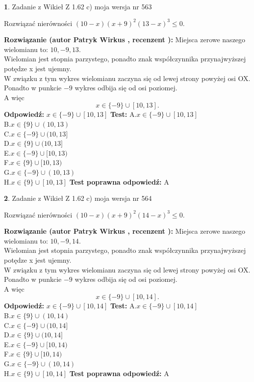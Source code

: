 \documentclass[12pt, a4paper]{article}
\theoremstyle{definition} %
\newtheorem{zad}{}
\newcommand{\zadStart}[1]{\begin{zad}#1\newline}
\newcommand{\zadStop}{\end{zad}}
\newcommand{\rozwStart}[2]{\noindent \textbf{Rozwiązanie (autor #1 , recenzent #2): }\newline}
\newcommand{\rozwStop}{\newline}
\newcommand{\odpStart}{\noindent \textbf{Odpowiedź:}\newline}
\newcommand{\odpStop}{\newline}
\newcommand{\testStart}{\noindent \textbf{Test:}\newline}
\newcommand{\testStop}{\newline}
\newcommand{\kluczStart}{\noindent \textbf{Test poprawna odpowiedź:}\newline}
\newcommand{\kluczStop}{\newline}
\begin{document}
\zadStart{Zadanie z Wikieł Z 1.62 c) moja wersja nr 563}

Rozwiązać nierówności $(10-x)(x+9)^{2}(13-x)^{3}\le0$.
\zadStop
\rozwStart{Patryk Wirkus}{}
Miejsca zerowe naszego wielomianu to: $10, -9, 13$.\\
Wielomian jest stopnia parzystego, ponadto znak współczynnika przy\linebreak najwyższej potędze x jest ujemny.\\ W związku z tym wykres wielomianu zaczyna się od lewej strony powyżej osi OX.\\
Ponadto w punkcie $-9$ wykres odbija się od osi poziomej.\\
A więc $$x \in \{-9\} \cup [10,13].$$
\rozwStop
\odpStart
$x \in \{-9\} \cup [10,13]$
\odpStop
\testStart
A.$x \in \{-9\} \cup [10,13]$\\
B.$x \in \{9\} \cup (10,13)$\\
C.$x \in \{-9\} \cup (10,13]$\\
D.$x \in \{9\} \cup (10,13]$\\
E.$x \in \{-9\} \cup [10,13)$\\
F.$x \in \{9\} \cup [10,13)$\\
G.$x \in \{-9\} \cup (10,13)$\\
H.$x \in \{9\} \cup [10,13]$
\testStop
\kluczStart
A
\kluczStop



\zadStart{Zadanie z Wikieł Z 1.62 c) moja wersja nr 564}

Rozwiązać nierówności $(10-x)(x+9)^{2}(14-x)^{3}\le0$.
\zadStop
\rozwStart{Patryk Wirkus}{}
Miejsca zerowe naszego wielomianu to: $10, -9, 14$.\\
Wielomian jest stopnia parzystego, ponadto znak współczynnika przy\linebreak najwyższej potędze x jest ujemny.\\ W związku z tym wykres wielomianu zaczyna się od lewej strony powyżej osi OX.\\
Ponadto w punkcie $-9$ wykres odbija się od osi poziomej.\\
A więc $$x \in \{-9\} \cup [10,14].$$
\rozwStop
\odpStart
$x \in \{-9\} \cup [10,14]$
\odpStop
\testStart
A.$x \in \{-9\} \cup [10,14]$\\
B.$x \in \{9\} \cup (10,14)$\\
C.$x \in \{-9\} \cup (10,14]$\\
D.$x \in \{9\} \cup (10,14]$\\
E.$x \in \{-9\} \cup [10,14)$\\
F.$x \in \{9\} \cup [10,14)$\\
G.$x \in \{-9\} \cup (10,14)$\\
H.$x \in \{9\} \cup [10,14]$
\testStop
\kluczStart
A
\kluczStop
\end{document}
